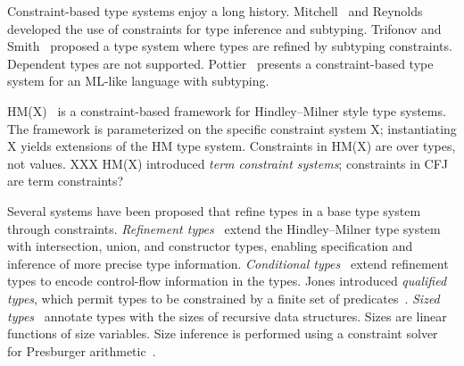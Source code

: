 Constraint-based type systems enjoy a long history.
Mitchell~\cite{mitchell84} and Reynolds~\cite{reynolds85}
developed the use of constraints for type inference and subtyping.
%
Trifonov and Smith~\cite{trifonov96}
proposed a type system where types are refined by subtyping
constraints.  Dependent types are not supported.
%
Pottier~\cite{pottier96simplifying,pottier01b}
presents a constraint-based type system for an ML-like language with
subtyping.

HM(X)~\cite{sulzmann97type,pottier01a,pottier-remy-attapl}
is a constraint-based framework
for Hindley--Milner style type systems.
The framework is parameterized on the specific constraint system
X; instantiating X yields extensions of the HM type system.
Constraints in HM(X) are over types, not values.
%
XXX HM(X) introduced {\em term constraint systems}; constraints in
CFJ are term constraints?












Several systems have been proposed that refine types in a base
type system through constraints.
%
{\em Refinement types}~\cite{refinement-types} extend the 
Hindley--Milner type system with intersection, union, and
constructor types, enabling specification and inference of
more precise type information.
%
{\em Conditional
types}~\cite{conditional-types} extend refinement types to
encode control-flow information in the types.
%
Jones introduced {\em qualified types}, which permit
types to be constrained by a finite set of
predicates~\cite{jones94}.
%
{\em Sized types}~\cite{sized-types}
annotate types with the sizes of recursive data structures.
Sizes are linear functions of size variables.
Size inference is performed using a constraint solver for
Presburger arithmetic~\cite{omega}.

